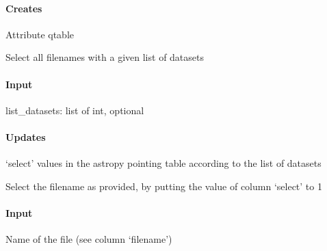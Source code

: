 \documentclass[letterpaper,10pt,english]{sphinxmanual}
\begin{document}
\begin{fulllineitems}
\begin{fulllineitems}
\paragraph{Creates}
\label{\detokenize{api/pymusepipe:id128}}
\sphinxAtStartPar
Attribute qtable

\end{fulllineitems}


\begin{fulllineitems}
\label{\detokenize{api/pymusepipe:pymusepipe.util_image.PointingTable.select_datasets}}
\pysigstartsignatures
{}
\pysigstopsignatures
\sphinxAtStartPar
Select all filenames with a given list of datasets


\paragraph{Input}
\label{\detokenize{api/pymusepipe:id129}}
\sphinxAtStartPar
list\_datasets: list of int, optional


\paragraph{Updates}
\label{\detokenize{api/pymusepipe:id130}}
\sphinxAtStartPar
‘select’ values in the astropy pointing table according to the list of datasets

\end{fulllineitems}


\begin{fulllineitems}
\label{\detokenize{api/pymusepipe:pymusepipe.util_image.PointingTable.select_filename}}
\pysigstartsignatures
{}
\pysigstopsignatures
\sphinxAtStartPar
Select the filename as provided, by putting the value of column ‘select’ to 1


\paragraph{Input}
\label{\detokenize{api/pymusepipe:id131}}\begin{description}
\sphinxAtStartPar
Name of the file (see column ‘filename’)


\end{description}
\end{fulllineitems}
\end{fulllineitems}
\end{document}
